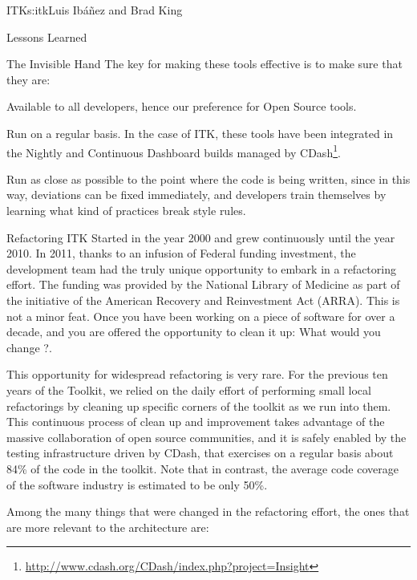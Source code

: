\begin{aosachapter}{ITK}{s:itk}{Luis Ib\'{a}\~{n}ez and Brad King}
\begin{aosasect1}{Lessons Learned}
\begin{aosasect2}{The Invisible Hand}
The key for making these tools effective is to make sure that they are:
\begin{aosaitemize}
\item Available to all developers, hence our preference for Open Source tools.
\item Run on a regular basis. In the case of ITK, these tools have been
integrated in the Nightly and Continuous Dashboard builds managed by
CDash\footnote{\url{http://www.cdash.org/CDash/index.php?project=Insight}}.
\item Run as close as possible to the point where the code is being written,
since in this way, deviations can be fixed immediately, and developers train
themselves by learning what kind of practices break style rules.
\end{aosaitemize}

\end{aosasect2}

\begin{aosasect2}{Refactoring}
ITK Started in the year 2000 and grew continuously until the year 2010. In
2011, thanks to an infusion of Federal funding investment, the development team
had the truly unique opportunity to embark in a refactoring effort. The funding
was provided by the National Library of Medicine as part of the initiative of
the American Recovery and Reinvestment Act (ARRA). This is not a minor feat.
Once you have been working on a piece of software for over a decade, and you
are offered the opportunity to clean it up: What would you change ?.

This opportunity for widespread refactoring is very rare. For the previous ten
years of the Toolkit, we relied on the daily effort of performing small local
refactorings by cleaning up specific corners of the toolkit as we run into
them.  This continuous process of clean up and improvement takes advantage of
the massive collaboration of open source communities, and it is safely enabled
by the testing infrastructure driven by CDash, that exercises on a regular
basis about 84\% of the code in the toolkit. Note that in contrast, the average
code coverage of the software industry is estimated to be only 50\%.

Among the many things that were changed in the refactoring effort, the ones
that are more relevant to the architecture are:


\end{aosasect2}
\end{aosasect1}
\end{aosachapter}
